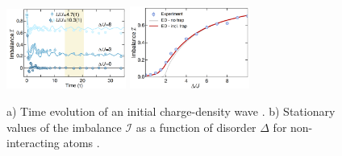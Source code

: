 \begin{figure}
    \centering
    \includegraphics[align=c, width=0.35\textwidth]{imgs/MBL_exp_1.png}
    \hspace{10 mm} 
    \includegraphics[align=c, width=0.35\textwidth]{imgs/MBL_exp_2.png}
    \caption{
    \cite{schreiber_observation_2015} 
    a) Time evolution of an initial charge-density wave
    . 
    b) Stationary values of the imbalance $\mathcal{I}$ as a function of disorder $\Delta$ for non-interacting atoms 
    .
    }
    \label{fig:loc1D1}
\end{figure} 






